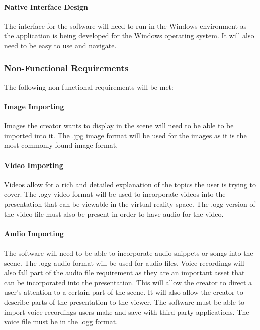 \documentclass{article}
\begin{document}
		\paragraph{Native Interface Design}

		The interface for the software will need to run in the Windows environment as the application is being developed for the Windows operating system.
		It will also need to be easy to use and navigate.

	\subsubsection{Non-Functional Requirements}

	The following non-functional requirements will be met:

		\paragraph{Image Importing}

		Images the creator wants to display in the scene will need to be able to be imported into it.
		The .jpg image format will be used for the images as it is the most commonly found image format.

		\paragraph{Video Importing}

		Videos allow for a rich and detailed explanation of the topics the user is trying to cover.
		The .ogv video format will be used to incorporate videos into the presentation that can be viewable in the virtual reality space. The .ogg version of the video file must also be present in order to have audio for the video.

		\paragraph{Audio Importing}

		The software will need to be able to incorporate audio snippets or songs into the scene.
		The .ogg audio format will be used for audio files.
		Voice recordings will also fall part of the audio file requirement as they are an important asset that can be incorporated into the presentation.
		This will allow the creator to direct a user's attention to a certain part of the scene.
		It will also allow the creator to describe parts of the presentation to the viewer.
		The software must be able to import voice recordings users make and save with third party applications. The voice file must be in the .ogg format.
\end{document}

